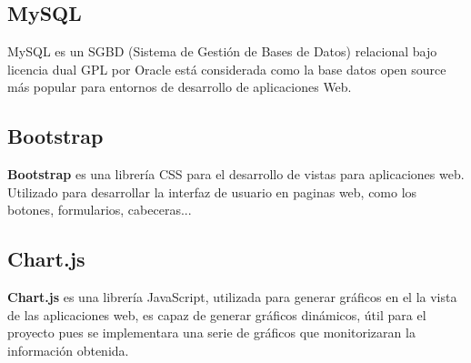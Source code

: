 \subsection{MySQL}

\setlength{\parindent}{5ex}MySQL es un SGBD (Sistema de Gestión de Bases de Datos)  relacional bajo licencia dual GPL por Oracle está considerada como la base datos open source más popular para entornos de desarrollo de aplicaciones Web.

\subsection{Bootstrap}

\textbf{Bootstrap} es una librería  CSS para el desarrollo de vistas para aplicaciones web. Utilizado para desarrollar la interfaz de usuario en paginas web, como los botones, formularios, cabeceras...

\subsection{Chart.js}

\textbf{Chart.js} es una librería JavaScript, utilizada para generar gráficos en el la vista de las aplicaciones web, es capaz de generar gráficos dinámicos, útil para el proyecto pues se implementara una serie de gráficos que monitorizaran la información obtenida.



